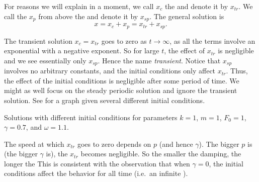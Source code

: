 
\medskip


For reasons we will explain in a moment, we call $x_c$ the
\emph{}
and denote it by $x_{tr}$.  We call the
$x_p$ from above the \emph{} and denote it
by $x_{sp}$.
The general solution is
\begin{equation*}
x = x_c + x_p = x_{tr} + x_{sp} .
\end{equation*}

The transient solution $x_c = x_{tr}$ goes to zero as $t \to \infty$,
as all the terms involve an exponential with a negative exponent.  So
for large $t$, the effect of $x_{tr}$ is negligible and we see essentially
only $x_{sp}$.
Hence the name \emph{transient}.
Notice that $x_{sp}$ involves no arbitrary constants, and
the initial conditions only affect $x_{tr}$.  Thus, the effect
of the initial conditions is negligible after some period of time.
We might as well focus on the
steady periodic solution and ignore the transient solution.  See
 for a graph given several different initial conditions.

\begin{mywrapfig}{3.25in}
\capstart
{}
\caption{Solutions with different initial conditions for parameters
$k=1$, $m=1$, $F_0 = 1$, $\gamma=0.7$, and $\omega=1.1$.\label{3.6:transbehfig}}
\end{mywrapfig}

The speed at which $x_{tr}$ goes to zero depends on $p$ (and
hence $\gamma$).  The
bigger $p$ is (the bigger $\gamma$ is), the  $x_{tr}$ becomes negligible. 
So the smaller the damping, the longer the 
This is consistent
with the observation that when $\gamma=0$, the initial conditions affect the
behavior for all time (i.e.\ an infinite ).

\medskip

